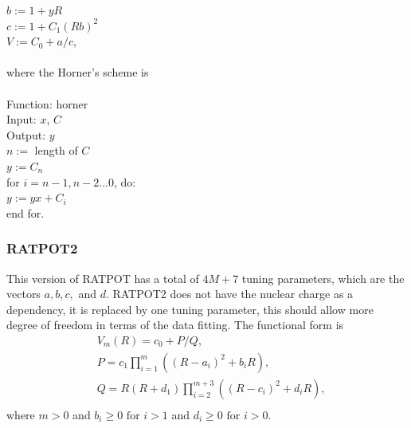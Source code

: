 \documentclass[12pt]{article}
\def\spc{\hspace*{0.5cm}} 			%
\begin{document}
$b := 1 + yR$\\
$c := 1 + C_1(Rb)^2$\\
$V := C_0 + a/c$, \\
\\
where the Horner's scheme is
\\
\\
Function: horner \\
Input: $x$, $C$ \\
Output: $y$ \\
$n := $ length of $C$ \\
$y := C_n$ \\
for $i=n-1, n-2 ... 0$, do: \\
\spc $y := yx + C_i$ \\
end for.


\subsubsection{RATPOT2}
This version of RATPOT has a total of $4M+7$ tuning parameters, which are the vectors $a, b, c,$ and $d$. RATPOT2 does not have the nuclear charge as a dependency, it is replaced by one tuning parameter, this should allow more degree of freedom in terms of the data fitting. The functional form is
\begin{equation}
    \begin{split}
        &V_m(R)=c_0+P/Q, \\
        &P=c_1\prod_{i=1}^m ((R-a_i)^2+b_i R), \\
        &Q=R(R+d_1)\prod_{i=2}^{m+3}((R-c_i)^2+d_i R), \\
    \end{split}
    \label{eq:ratpot2}
\end{equation}
where
$m>0$ and $b_i \ge 0 \text{ for } i>1$ and $d_i \ge 0 \text{ for } i>0$.

\end{document}
